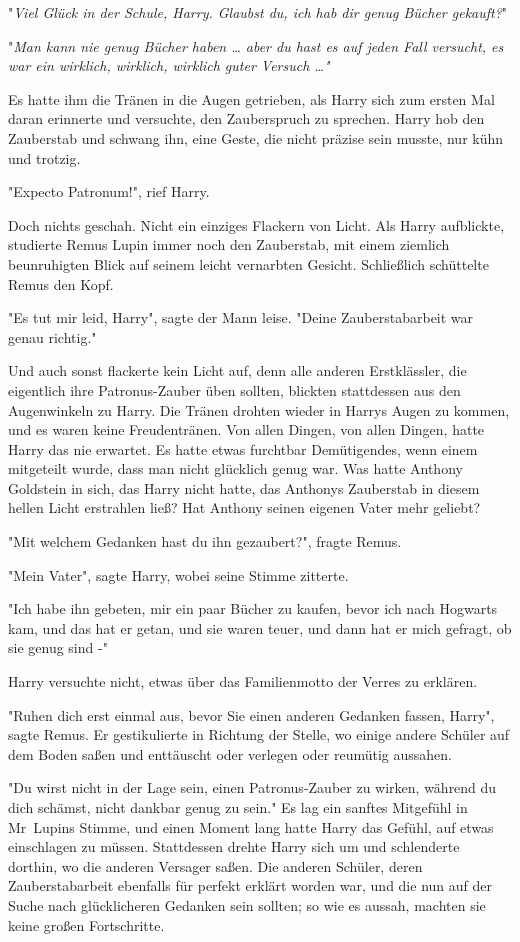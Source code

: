 {"\emph{Viel Glück in der Schule, Harry. Glaubst du, ich hab dir genug Bücher gekauft?}"

"\emph{Man kann nie genug Bücher haben … aber du hast es auf jeden Fall versucht, es war ein wirklich, wirklich, wirklich guter Versuch …"}

Es hatte ihm die Tränen in die Augen getrieben, als Harry sich zum ersten Mal daran erinnerte und versuchte, den Zauberspruch zu sprechen. Harry hob den Zauberstab und schwang ihn, eine Geste, die nicht präzise sein musste, nur kühn und trotzig.

"Expecto Patronum!", rief Harry.

Doch nichts geschah. Nicht ein einziges Flackern von Licht. Als Harry aufblickte, studierte Remus Lupin immer noch den Zauberstab, mit einem ziemlich beunruhigten Blick auf seinem leicht vernarbten Gesicht. Schließlich schüttelte Remus den Kopf.

"Es tut mir leid, Harry", sagte der Mann leise. "Deine Zauberstabarbeit war genau richtig."

Und auch sonst flackerte kein Licht auf, denn alle anderen Erstklässler, die eigentlich ihre Patronus-Zauber üben sollten, blickten stattdessen aus den Augenwinkeln zu Harry. Die Tränen drohten wieder in Harrys Augen zu kommen, und es waren keine Freudentränen. Von allen Dingen, von allen Dingen, hatte Harry das nie erwartet. Es hatte etwas furchtbar Demütigendes, wenn einem mitgeteilt wurde, dass man nicht glücklich genug war. Was hatte Anthony Goldstein in sich, das Harry nicht hatte, das Anthonys Zauberstab in diesem hellen Licht erstrahlen ließ? Hat Anthony seinen eigenen Vater mehr geliebt?

"Mit welchem Gedanken hast du ihn gezaubert?", fragte Remus.

"Mein Vater", sagte Harry, wobei seine Stimme zitterte.

"Ich habe ihn gebeten, mir ein paar Bücher zu kaufen, bevor ich nach Hogwarts kam, und das hat er getan, und sie waren teuer, und dann hat er mich gefragt, ob sie genug sind -"

Harry versuchte nicht, etwas über das Familienmotto der Verres zu erklären.

"Ruhen dich erst einmal aus, bevor Sie einen anderen Gedanken fassen, Harry", sagte Remus. Er gestikulierte in Richtung der Stelle, wo einige andere Schüler auf dem Boden saßen und enttäuscht oder verlegen oder reumütig aussahen.

"Du wirst nicht in der Lage sein, einen Patronus-Zauber zu wirken, während du dich schämst, nicht dankbar genug zu sein." Es lag ein sanftes Mitgefühl in Mr~Lupins Stimme, und einen Moment lang hatte Harry das Gefühl, auf etwas einschlagen zu müssen. Stattdessen drehte Harry sich um und schlenderte dorthin, wo die anderen Versager saßen. Die anderen Schüler, deren Zauberstabarbeit ebenfalls für perfekt erklärt worden war, und die nun auf der Suche nach glücklicheren Gedanken sein sollten; so wie es aussah, machten sie keine großen Fortschritte.

}
